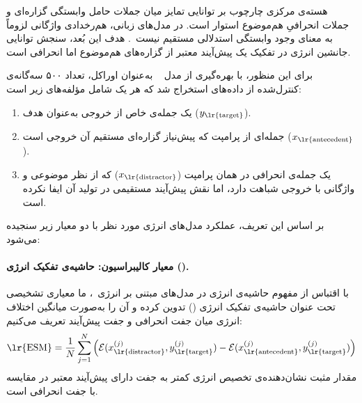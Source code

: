 هسته‌ی مرکزی چارچوب  بر توانایی تمایز میان جملات حامل وابستگی گزاره‌ای و جملات انحرافیِ هم‌موضوع استوار است. در مدل‌های زبانی، هم‌رخدادی واژگانی لزوماً به معنای وجود وابستگی استدلالی مستقیم نیست~\cite{kaushik2020learning}. هدف این بُعد، سنجش توانایی جانشین انرژی در تفکیک یک پیش‌آیند معتبر از گزاره‌های هم‌موضوع اما انحرافی است.

برای این منظور، با بهره‌گیری از مدل ~\cite{comanici2025gemini25} به‌عنوان اوراکل، تعداد ۵۰۰ سه‌گانه‌ی کنترل‌شده از داده‌های  استخراج شد که هر یک شامل مؤلفه‌های زیر است:
\begin{enumerate}
    \vspace{-0.05cm}
    \item یک جمله‌ی خاص از خروجی به‌عنوان هدف ($y_{\text{\lr{target}}}$).
    \vspace{-0.05cm}
    \item جمله‌ای از پرامپت که پیش‌نیاز گزاره‌ای مستقیم آن خروجی است ($x_{\text{\lr{antecedent}}}$).
    \vspace{-0.05cm}
    \item یک جمله‌ی انحرافی در همان پرامپت ($x_{\text{\lr{distractor}}}$) که از نظر موضوعی و واژگانی با خروجی شباهت دارد، اما نقش پیش‌آیند مستقیمی در تولید آن ایفا نکرده است.
\end{enumerate}

بر اساس این تعریف، عملکرد مدل‌های انرژی مورد نظر با دو معیار زیر سنجیده می‌شود:

\paragraph{معیار کالیبراسیون: حاشیه‌ی تفکیک انرژی ().}
با اقتباس از مفهوم حاشیه‌ی انرژی در مدل‌های مبتنی بر انرژی~\cite{lecun2006tutorial}، ما معیاری تشخیصی تحت عنوان حاشیه‌ی تفکیک انرژی () تدوین کرده و آن را به‌صورت میانگین اختلاف انرژی میان جفت انحرافی و جفت پیش‌آیند تعریف می‌کنیم:
\begin{equation}
    \text{\lr{ESM}} = \frac{1}{N} \sum_{j=1}^{N} \Big( \mathcal{E}(x_{\text{\lr{distractor}}}^{(j)}, y_{\text{\lr{target}}}^{(j)}) - \mathcal{E}(x_{\text{\lr{antecedent}}}^{(j)}, y_{\text{\lr{target}}}^{(j)}) \Big) \label{eq:chap5_esm}
\end{equation}
مقدار مثبت  نشان‌دهنده‌ی تخصیص انرژی کمتر به جفت دارای پیش‌آیند معتبر در مقایسه با جفت انحرافی است.

